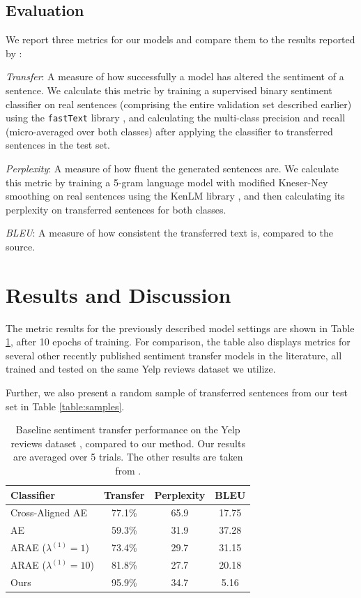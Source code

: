 \documentclass{article}
\begin{document}
\subsection{Evaluation}
We report three metrics for our models and compare them to the results reported by \citeauthor{arae}:

\textit{Transfer}: A measure of how successfully a model has altered the sentiment of a sentence. We calculate this metric by training a supervised binary sentiment classifier on real sentences (comprising the entire validation set described earlier) using the \texttt{fastText} library \cite{fasttext}, and calculating the multi-class precision and recall (micro-averaged over both classes) after applying the classifier to transferred sentences in the test set.

\textit{Perplexity}: A measure of how fluent the generated sentences are. We calculate this metric by training a 5-gram language model with modified Kneser-Ney smoothing on real sentences using the KenLM library \cite{kenlm}, and then calculating its perplexity on transferred sentences for both classes.

\textit{BLEU}: A measure of how consistent the transferred text is, compared to the source. 


\section{Results and Discussion}

The metric results for the previously described model settings are shown in Table \ref{table:baselines}, after 10 epochs of training. For comparison, the table also displays metrics for several other recently published sentiment transfer models in the literature, all trained and tested on the same Yelp reviews dataset we utilize. 

Further, we also present a random sample of transferred sentences from our test set in Table \ref{table:samples}.

\begin{table} \label{table:baselines}
	\centering
	\begin{tabular}{lccc}
		\toprule
		Classifier & Transfer & Perplexity & BLEU \\
		\midrule
		Cross-Aligned AE & 77.1\% & 65.9 & 17.75 \\
		AE & 59.3\% & 31.9 & 37.28 \\
		ARAE ($\lambda^{(1)} = 1$) & 73.4\% & 29.7 & 31.15 \\
		ARAE ($\lambda^{(1)} = 10$) & 81.8\% & 27.7 & 20.18 \\
		\midrule
		Ours & 95.9\% & 34.7 & 5.16 \\
		\bottomrule
	\end{tabular}
	\caption{Baseline sentiment transfer performance on the Yelp reviews dataset \cite{yelp}, compared to our method. Our results are averaged over 5 trials. The other results are taken from \citeauthor{arae}.}
\end{table}
\end{document}
